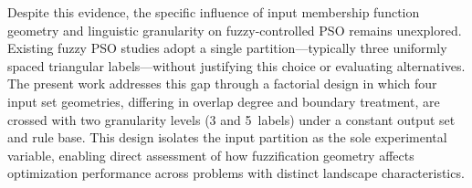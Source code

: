 Despite this evidence, the specific influence of input membership function geometry and linguistic granularity on fuzzy-controlled PSO remains unexplored. Existing fuzzy PSO studies adopt a single partition---typically three uniformly spaced triangular labels---without justifying this choice or evaluating alternatives. The present work addresses this gap through a factorial design in which four input set geometries, differing in overlap degree and boundary treatment, are crossed with two granularity levels (3 and 5~labels) under a constant output set and rule base. This design isolates the input partition as the sole experimental variable, enabling direct assessment of how fuzzification geometry affects optimization performance across problems with distinct landscape characteristics.
